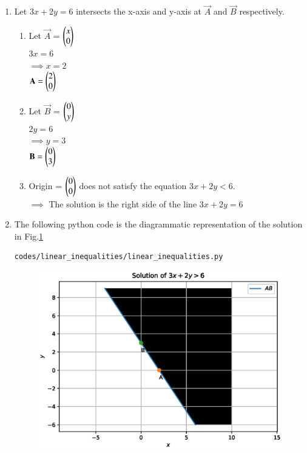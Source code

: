 \renewcommand{\theequation}{\theenumi}
\begin{enumerate}[label=\arabic*.,ref=\thesubsubsection.\theenumi]
%
\item Let $3x+2y=6$ intersects the x-axis and y-axis at $\vec{A}$ and $\vec{B}$ respectively.
\begin{enumerate}
\item Let $\vec{A}$ = $\begin{pmatrix}x\\0\end{pmatrix}$ \\
$3x = 6$ \\
$\implies x=2$ \\
$\mathbf{A} = \begin{pmatrix}2\\0\end{pmatrix}$
\item Let $\vec{B}$ = $\begin{pmatrix}0\\y\end{pmatrix}$ \\
$2y = 6$ \\
$\implies y=3$ \\
$\mathbf{B} = \begin{pmatrix}0\\3\end{pmatrix}$
\item Origin = $\begin{pmatrix}0\\0\end{pmatrix}$ does not satisfy the equation $3x+2y<6$. \\
$\implies$ The solution is the right side of the line $3x+2y=6$ \\
\end{enumerate}

\item The following python code is the diagrammatic representation of the solution in Fig.\ref{fig:line_ineq}
\begin{lstlisting}
codes/linear_inequalities/linear_inequalities.py
\end{lstlisting}

\begin{figure}[!ht]
\includegraphics[width=\columnwidth]{./codes/line/linear_inequalities/linear_inequalities.eps}
\caption{}
\label{fig:line_ineq}
\end{figure} 

\end{enumerate}
 

 
 